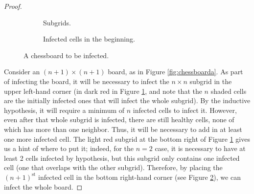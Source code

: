 \documentclass[../main.tex]{subfiles}
\begin{document}
\begin{enumerate}
\begin{proof}
\begin{figure}[h!]
\begin{subfigure}[b]{0.3\linewidth}
                \caption{Subgrids.}
                \label{fig:chessboardb}
            \end{subfigure}
            \begin{subfigure}[b]{0.3\linewidth}
                \centering
                \caption{Infected cells in the beginning.}
                \label{fig:chessboardc}
            \end{subfigure}
            \caption{A chessboard to be infected.}
            \label{fig:chessboard}
        \end{figure}
        Consider an $(n+1)\times(n+1)$ board, as in Figure \ref{fig:chessboarda}. As part of infecting the board, it will be necessary to infect the $n\times n$ subgrid in the upper left-hand corner (in dark red in Figure \ref{fig:chessboardb}, and note that the $n$ shaded cells are the initially infected ones that will infect the whole subgrid). By the inductive hypothesis, it will require a minimum of $n$ infected cells to infect it. However, even after that whole subgrid is infected, there are still healthy cells, none of which has more than one neighbor. Thus, it will be necessary to add in at least one more infected cell. The light red subgrid at the bottom right of Figure \ref{fig:chessboardb} gives us a hint of where to put it; indeed, for the $n=2$ case, it is necessary to have at least 2 cells infected by hypothesis, but this subgrid only contains one infected cell (one that overlaps with the other subgrid). Therefore, by placing the $(n+1)^\text{st}$ infected cell in the bottom right-hand corner (see Figure \ref{fig:chessboardc}), we can infect the whole board.
    \end{proof}

\end{enumerate}
\end{document}
